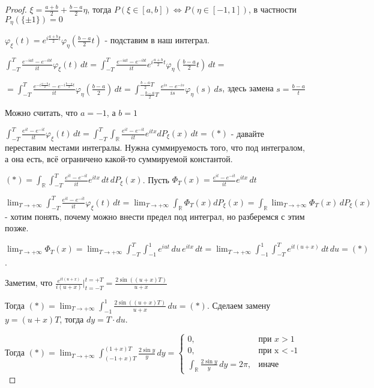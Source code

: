 \begin{proof}
    $\xi = \frac{a + b}{2} + \frac{b - a}{2}\eta$, тогда $P(\xi \in [a, b]) \Leftrightarrow P(\eta \in [-1, 1])$, в частности
    $P_{\eta}(\{ \pm 1 \}) = 0$

    $\varphi_{\xi}(t) = e^{i \frac{a + b}{2} t} \varphi_{\eta}(\frac{b - a}{2}t)$ - подставим в наш интеграл.

    $ \int_{-T}^{T} \frac{e^{-iat} - e^{-ibt}}{it} \varphi_{\xi} (t) \, dt = \int_{-T}^{T} \frac{e^{-iat} - e^{-ibt}}{it} e^{i \frac{a + b}{2} t} \varphi_{\eta} (\frac{b - a}{2} t) \, dt = $

    $ = \int_{-T}^{T} \frac{e^{-i\frac{a - b}{2}t} - e^{-i\frac{b - a}{2}t}}{it} \varphi_{\eta} (\frac{b - a}{2}) \, dt = \int_{-\frac{b - a}{2}T}^{\frac{b - a}{2}T} \frac{e^{is} - e^{-is}}{is} \varphi_{\eta} (s) \, ds$, здесь замена $s = \frac{b - a}{t}$

    Можно считать, что $a = -1$, а $b = 1$

    $\int_{-T}^T \frac{e^{it} - e^{-it}}{it} \varphi_{\xi}(t) \, dt = \int_{-T}^T \int_{\mathbb{R}} \frac{e^{it} - e^{-it}}{it} e^{itx} dP_{\xi}(x) \, dt = (*)$ - давайте переставим местами интегралы.
    Нужна суммируемость того, что под интегралом, а она есть, всё ограничено какой-то суммируемой константой.
    
    $(*) = \int_{\mathbb{R}} \int_{-T}^T \frac{e^{it} - e^{-it}}{it} e^{itx} \, dt \, dP_{\xi}(x)$.  Пусть $\Phi_T (x) = \frac{e^{it} - e^{-it}}{it} e^{itx} \, dt$

    $\lim_{T \to +\infty} \int_{-T}^T \frac{e^{it} - e^{-it}}{it} \varphi_{\xi} (t) \, dt = \lim_{T \to +\infty} \int_{\mathbb{R}} \Phi_T(x) dP_{\xi} (x) = \int_{\mathbb{R}} \lim_{T \to +\infty} \Phi_T (x) \, dP_{\xi} (x) $ - хотим понять, почему 
    можно внести предел под интеграл, но разберемся с этим позже.

    $\lim_{T \to +\infty} \Phi_T (x) = \lim_{T \to +\infty} \int_{-T}^{T} \int_{-1}^1 e^{iut} \, du \, e^{itx} \, dt = \lim_{T \to +\infty} \int_{-1}^1 \int_{-T}^T e^{it(u + x)} \, dt \, du = (*)$.

    Заметим, что $\frac{e^{it(u + x)}}{i(u + x)} \bigg |_{t = -T}^{t = +T} = \frac{2\sin ((u + x)T)}{u + x}$

    Тогда $(*) = \lim_{T \to +\infty} \int_{-1}^1 \frac{2\sin ((u + x)T)}{u + x} \, du = (*)$. Сделаем замену $y = (u + x)T$, тогда $dy = T \cdot du$.

    Тогда $(*) = \lim_{T \to +\infty} \int_{(-1 + x)T}^{(1 + x)T} \frac{2 \sin y}{y} \, dy = \begin{cases}
        0, & \text{при $x > 1$} \\
        0, & \text{при x < -1} \\
        \int_{\mathbb{R}} \frac{2 \sin y}{y} \, dy = 2\pi, & \text{иначе}
    \end{cases}$


\end{proof}
